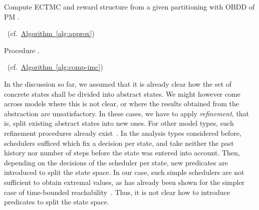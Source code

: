 \documentclass[10pt,twocolumn]{article}
\newcommand{\refalg}[1]{\texorpdfstring{\hyperref[alg:#1]{Algorithm~\ref*{alg:#1}}}{Algorithm~\ref*{alg:#1}}}
\begin{document}
\begin{algorithm}
  \caption{\label{alg:comp-imc}Compute ECTMC and reward structure from a given partitioning 
     with OBDD  
    of PM .}
  \DontPrintSemicolon
  ~(cf.~\refalg{approx}) \;
   \;
   \;
   \;
   \;
   \label{lin:call-approx} \;
 \Return   \;
\end{algorithm}

\begin{algorithm}
  \newcommand{\level}{\mathrm{level}}
  \caption{\label{alg:approx}Procedure .}
  \DontPrintSemicolon
  ~(cf.~\refalg{comp-imc}) \;
  \lIf{}{\Return \;
  }
\end{algorithm}


In the discussion so far, we assumed that it is already clear how the
set of concrete states shall be divided into abstract states. We
might however come across models where this is not clear, or where the
results obtained from the abstraction are unsatisfactory. In these
cases, we have to apply \emph{refinement}, that is, split existing
abstract states into new ones. For other model types, such refinement
procedures already exist~\cite{KattenbeltKNP10,HermannsWZ08}. In the
analysis types considered before, schedulers sufficed which fix a
decision per state, and take neither the past history nor number of
steps before the state was entered into account. Then, depending on
the decisions of the scheduler per state, new predicates are
introduced to split the state space. In our case, such simple
schedulers are not sufficient to obtain extremal values, as has
already been shown for the simpler case of time-bounded
reachability~\cite{BaierHKH05}. Thus, it is not clear how to
introduce predicates to split the state space.
\end{document}
